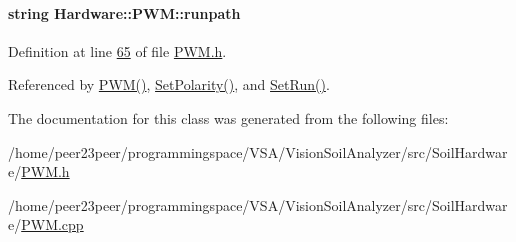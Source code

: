\paragraph[{runpath}]{\setlength{\rightskip}{0pt plus 5cm}string Hardware\+::\+P\+W\+M\+::runpath\hspace{0.3cm}{\ttfamily [private]}}\label{class_hardware_1_1_p_w_m_ac1eb93467481ee2bd3565f1be47b8a01}


Definition at line \hyperlink{_p_w_m_8h_source_l00065}{65} of file \hyperlink{_p_w_m_8h_source}{P\+W\+M.\+h}.



Referenced by \hyperlink{_p_w_m_8cpp_source_l00015}{P\+W\+M()}, \hyperlink{_p_w_m_8cpp_source_l00149}{Set\+Polarity()}, and \hyperlink{_p_w_m_8cpp_source_l00138}{Set\+Run()}.



The documentation for this class was generated from the following files\+:\begin{DoxyCompactItemize}
\item 
/home/peer23peer/programmingspace/\+V\+S\+A/\+Vision\+Soil\+Analyzer/src/\+Soil\+Hardware/\hyperlink{_p_w_m_8h}{P\+W\+M.\+h}\item 
/home/peer23peer/programmingspace/\+V\+S\+A/\+Vision\+Soil\+Analyzer/src/\+Soil\+Hardware/\hyperlink{_p_w_m_8cpp}{P\+W\+M.\+cpp}\end{DoxyCompactItemize}
